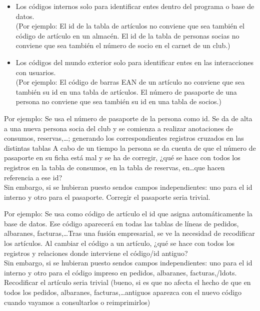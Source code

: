 \documentclass[spanish,12pt,a4paper,final,oneside]{book}
\begin{document}
\begin{itemize}

\item Los códigos internos solo para identificar entes dentro del programa o base de datos.
\\(Por ejemplo: El id de la tabla de artículos no conviene que sea también el código de artículo en un almacén. El id de la tabla de personas socias no conviene que sea también el número de socio en el carnet de un club.)

\item Los códigos del mundo exterior solo para identificar entes en las interacciones con usuarios.
\\(Por ejemplo: El código de barras EAN de un artículo no conviene que sea también su id en una tabla de artículos. El número de pasaporte de una persona no conviene que sea también su id en una tabla de socios.)

\end{itemize}

Por ejemplo: Se usa el número de pasaporte de la persona como id. Se da de alta a una nueva persona socia del club y se comienza a realizar anotaciones de consumos, reservas,\ldots; generando los correspondientes registros cruzados en las distintas tablas  A cabo de un tiempo la persona se da cuenta de que el número de pasaporte en su ficha está mal y se ha de corregir, ¿qué se hace con todos los registros en la tabla de consumos, en la tabla de reservas, en\ldots que hacen referencia a ese id?
\\Sin embargo, si se hubieran puesto sendos campos independientes: uno para el id interno y otro para el pasaporte. Corregir el pasaporte seria trivial.

Por ejemplo: Se usa como código de artículo el id que asigna automáticamente la base de datos. Ese código aparecerá en todas las tablas de líneas de pedidos, albaranes, facturas,\ldots Tras una fusión empresarial, se ve la necesidad de recodificar los artículos. Al cambiar el código a un artículo, ¿qué se hace con todos los registros y relaciones donde interviene el código/id antiguo?
\\Sin embargo, si se hubieran puesto sendos campos independientes: uno para el id interno y otro para el código impreso en pedidos, albaranes, facturas,/ldots. Recodificar el artículo seria trivial (bueno, si es que no afecta el hecho de que en todos los pedidos, albaranes, facturas,\ldots antiguos aparezca con el nuevo código cuando vayamos a consultarlos o reimprimirlos)
\end{document}
